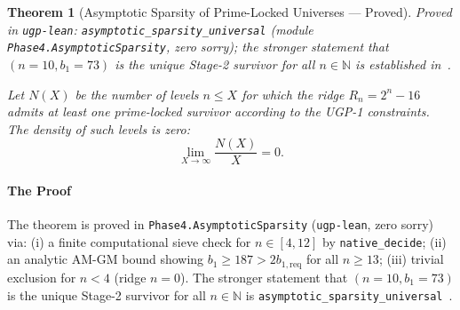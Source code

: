 \documentclass[12pt]{article}
\newtheorem{theorem}{Theorem}[section]
\numberwithin{equation}{section}
\begin{document}
\begin{theorem}[Asymptotic Sparsity of Prime-Locked Universes — Proved]
\label{conj:asymptotic_sparsity}
\noindent\emph{Proved in} \texttt{ugp-lean}: \texttt{asymptotic\_sparsity\_universal} (module \texttt{Phase4.AsymptoticSparsity}, zero sorry); the stronger statement that $(n{=}10,b_1{=}73)$ is the \emph{unique} Stage-2 survivor for \emph{all} $n\in\mathbb{N}$ is established in~\cite{Spivack2026_Uniqueness25}.

Let $N(X)$ be the number of levels $n \le X$ for which the ridge $R_n = 2^n - 16$ admits at least one prime-locked survivor according to the UGP-1 constraints. The density of such levels is zero:
\begin{equation}
    \lim_{X \to \infty} \frac{N(X)}{X} = 0.
\end{equation}
\end{theorem}
\paragraph{The Proof}
The theorem is proved in \texttt{Phase4.AsymptoticSparsity} (\texttt{ugp-lean}, zero sorry) via: (i) a finite computational sieve check for $n\in[4,12]$ by \texttt{native\_decide}; (ii) an analytic AM-GM bound showing $b_1\ge 187 > 2b_{1,\mathrm{req}}$ for all $n\ge 13$; (iii) trivial exclusion for $n<4$ (ridge $n=0$). The stronger statement that $(n{=}10,b_1{=}73)$ is the unique Stage-2 survivor for all $n\in\mathbb{N}$ is \texttt{asymptotic\_sparsity\_universal}~\cite{Spivack2026_Uniqueness25}.
\end{document}
